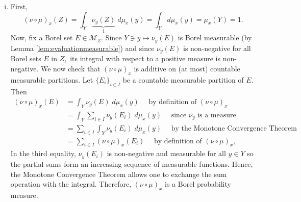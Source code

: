 \documentclass[12pt]{article}
\theoremstyle{theorem}
\theoremstyle{definition}
\numberwithin{equation}{section}
\newcommand{\be}{\begin{equation}}
\newcommand{\ee}{\end{equation}}
\newcommand{\<}{\langle}
\renewcommand{\>}{\rangle}
\begin{document}
\begin{enumerate}[i.]
\setlength{\itemsep}{0pt}
\item 
First, 
\be
(\nu\circ\mu)_{x}(Z)=\int_{Y}\underbrace{\nu_{y}(Z)}_{1}\;d\mu_{x}(y)
=\int_{Y}d\mu_{x}(y)
=\mu_{x}(Y)
=1.
\ee
Now, fix a Borel set $E\in\mathcal{M}_{Z}.$
Since $Y\ni y\mapsto\nu_{y}(E)$ is Borel measurable (by Lemma 
\ref{lem:evaluationmeasurable})
and since $\nu_{y}(E)$ is non-negative for all Borel sets $E$
in $Z,$ its integral with respect to a positive measure is non-negative. 
We now check that $(\nu\circ\mu)_{x}$ is additive on (at most)
countable measurable partitions.
Let $\{E_{i}\}_{i\in I}$ be a countable
measurable partition of $E.$ Then
\be
\begin{split}
(\nu\circ\mu)_{x}(E)&=\int_{Y}\nu_{y}(E)\;d\mu_{x}(y)\quad\text{ by definition of $(\nu\circ\mu)_{x}$}\\
&=\int_{Y}\sum_{i\in I}\nu_{y}(E_{i})\;d\mu_{x}(y)\quad\text{ since $\nu_{y}$ is a measure}\\
&=\sum_{i\in I}\int_{Y}\nu_{y}(E_{i})\;d\mu_{x}(y)\quad\text{ by the Monotone Convergence Theorem}\\
&=\sum_{i\in I}(\nu\circ\mu)_{x}(E_{i})\quad\text{ by definition of $(\nu\circ\mu)_{x}$},
\end{split}
\ee
In the third equality, 
$\nu_{y}(E_{i})$ is non-negative and measurable for all $y\in Y$
so the partial sums form an increasing sequence of measurable functions. 
Hence, the Monotone Convergence Theorem
allows one to exchange the sum operation with the integral. 
Therefore, $(\nu\circ\mu)_{x}$ is a Borel probability measure. 


\end{enumerate}
\end{document}

